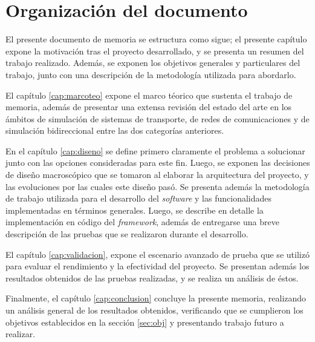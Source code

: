 \section{Organización del documento}

El presente documento de memoria se estructura como sigue; el presente capítulo expone la motivación tras el proyecto desarrollado, y se presenta un resumen del trabajo realizado.
Además, se exponen los objetivos generales y particulares del trabajo, junto con una descripción de la metodología utilizada para abordarlo.

El capítulo \ref{cap:marcoteo} expone el marco téorico que sustenta el trabajo de memoria, además de presentar una extensa revisión del estado del arte en los ámbitos de simulación de sistemas de transporte, de redes de comunicaciones y de simulación bidireccional entre las dos categorías anteriores.

En el capítulo \ref{cap:diseno} se  define primero claramente el problema a solucionar junto con las opciones consideradas para este fin. Luego, se exponen las decisiones de diseño macroscópico que se tomaron al elaborar la arquitectura del proyecto, y las evoluciones por las cuales este diseño pasó. Se presenta además la metodología de trabajo utilizada para el desarrollo del \emph{software} y las funcionalidades implementadas en términos generales. Luego, se describe en detalle la implementación en código del \emph{framework}, además de entregarse una breve descripción de las pruebas que se realizaron durante el desarrollo.

El capítulo \ref{cap:validacion}, expone el escenario avanzado de prueba que se utilizó para evaluar el rendimiento y la efectividad del proyecto. Se presentan además los resultados obtenidos de las pruebas realizadas, y se realiza un análisis de éstos.

Finalmente, el capítulo \ref{cap:conclusion} concluye la presente memoria, realizando un análisis general de los resultados obtenidos, verificando que se cumplieron los objetivos establecidos en la sección \ref{sec:obj} y presentando trabajo futuro a realizar.

